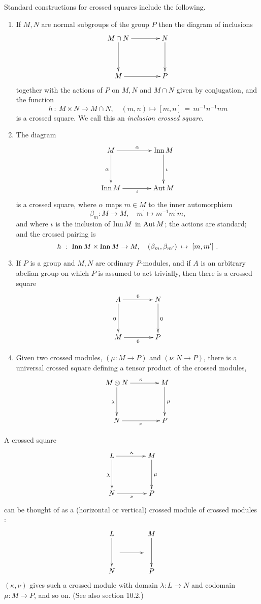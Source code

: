 \documentclass[a4paper,11pt]{article}
\theoremstyle{plain}
\theoremstyle{definition}
\begin{document}
Standard constructions for crossed squares include the following.
\begin{enumerate}
	\item 
	If $M,N$ are normal subgroups of the group $P$ then the diagram of inclusions
	\[
	\xymatrix@R=40pt@C=40pt
	{ M \cap N \ar[r]^(0.6){} \ar[d]_{}  
		& N \ar[d]^{} \\
		M \ar[r]_{}  
		& P }
	\] 
	\noindent together with the actions of $P$ on $M,N$ and $M\cap N$ 
	given by conjugation, and the function
	\[
	h ~:~ M\times N \rightarrow M\cap N,\quad 
	(m,n)\mapsto [m,n] \,=\, m^{-1}n^{-1}mn
	\] 
	is a crossed square. 
	We call this an \emph{inclusion crossed square}.
	\item 
	The diagram
	\[
	\xymatrix@R=40pt@C=40pt
	{ M \ar[r]^{\alpha} \ar[d]_{\alpha} 
		& \Inn\,M \ar[d]^{\iota} \\
		\Inn\,M \ar[r]_{\iota} 
		& \Aut\,M }
	\] 
	\noindent is a crossed square, 
	where $\alpha $ maps $m\in M$ to the inner automorphism%
	\[
	\beta_{m} : M \rightarrow M,\quad 
	m^{\prime}\mapsto m^{-1}m^{\prime}m, 
	\]
	and where $\iota $ is the inclusion of $\mathrm{Inn}\,M$ in $\mathrm{Aut}\,M$; 
	the actions are standard; and the crossed pairing is
	\[
	h ~:~ \mathrm{Inn}\,M \times \mathrm{Inn}\,M \rightarrow M,\quad 
	(\beta_{m},\beta_{m^{\prime}}) \;\mapsto\; [m,m^{\prime}]~.
	\]
	\item 
	If $P$ is a group and $M,N$ are ordinary $P$-modules, 
	and if $A$ is an arbitrary abelian group on which $P$ is assumed to act trivially, 
	then there is a crossed square
	\[
	\xymatrix@R=40pt@C=40pt
	{ A \ar[r]^{0} \ar[d]_{0}  
		& N \ar[d]^{0} \\
		M \ar[r]_{0} 
		& P }
	\]
	\item 
	Given two crossed modules, $(\mu : M \rightarrow P)$ and $(\nu : N \rightarrow P)$, 
	there is a universal crossed square defining a tensor product of the crossed modules, 
	\[
	\xymatrix@R=40pt@C=40pt
	{ M \otimes N \ar[d]_{\lambda} \ar[r]^{\kappa} 
		& M \ar[d]^{\mu} \\ 
		N \ar[r]_{\nu} 
		& P } 
	\]
\end{enumerate}

A crossed square
\[
\xymatrix@R=40pt@C=40pt
{ L \ar[d]_{\lambda} \ar[r]^{\kappa} 
	& M \ar[d]^{\mu} \\ 
	N \ar[r]_{\nu} 
	& P } 
\]
\noindent can be thought of as a (horizontal or vertical) 
crossed module of crossed modules :
\[
\xymatrix@R=17pt@C=17pt
{ L \ar[dd]_{}  
	& & M \ar[dd]^{} \\ 
	\ar@{}[rr]^(.15){}="a"^(.85){}="b" \ar "a";"b" 
	& & \\ 
	N & & P } 
\]
\noindent $(\kappa,\nu)$ gives such a crossed module with domain 
$\lambda : L \rightarrow N$ and codomain $\mu : M \rightarrow P$, and so on. 
(See also \cite{wensley_notes} section 10.2.)
\end{document}
